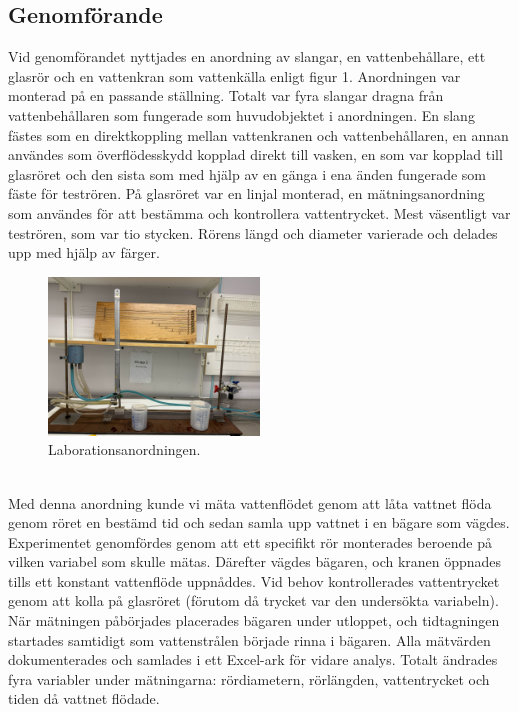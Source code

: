 \documentclass[a4paper,12pt]{article}
\begin{document}
\subsection{Genomförande}
    Vid genomförandet nyttjades en anordning av slangar, en vattenbehållare,
    ett glasrör och en vattenkran som vattenkälla enligt figur 1. Anordningen
    var monterad på en passande ställning. Totalt var fyra slangar dragna från
    vattenbehållaren som fungerade som huvudobjektet i anordningen. En slang
    fästes som en direktkoppling mellan vattenkranen och vattenbehållaren, en
    annan användes som överflödesskydd kopplad direkt till vasken, en som var
    kopplad till glasröret och den sista som med hjälp av en gänga i ena änden
    fungerade som fäste för teströren. På glasröret var en linjal monterad, en
    mätningsanordning som användes för att bestämma och kontrollera
    vattentrycket. Mest väsentligt var teströren, som var tio stycken. Rörens
    längd och diameter varierade och delades upp med hjälp av färger. \\
    \begin{figure}[h]
        \centering
        \includegraphics[width=0.5\textwidth]{Labb-yta.jpg}
        \caption{Laborationsanordningen.}
        \label{fig:experiment_setup}
    \end{figure} \\
    Med denna anordning kunde vi mäta vattenflödet genom att låta vattnet flöda genom röret en bestämd tid och sedan samla upp vattnet i en bägare som vägdes.
    Experimentet genomfördes genom att ett specifikt rör monterades beroende på vilken variabel som skulle mätas. Därefter vägdes bägaren, och kranen öppnades tills ett konstant vattenflöde uppnåddes. Vid behov kontrollerades vattentrycket genom att kolla på glasröret (förutom då trycket var den undersökta variabeln).
    När mätningen påbörjades placerades bägaren under utloppet, och tidtagningen startades samtidigt som vattenstrålen började rinna i bägaren. Alla mätvärden dokumenterades och samlades i ett Excel-ark för vidare analys. Totalt ändrades fyra variabler under mätningarna: rördiametern, rörlängden, vattentrycket och tiden då vattnet flödade.
\end{document}
